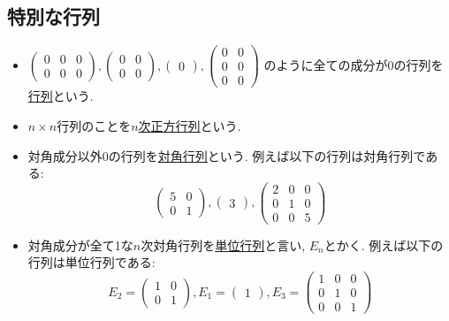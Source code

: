 \documentclass[dvipdfmx,a4paper,11pt]{article}
\theoremstyle{definition}
\begin{document}
\subsection{特別な行列}
\begin{itemize}
\item  $
 \begin{pmatrix}
0 &0&0\\
0 &0&0
 \end{pmatrix}, 
  \begin{pmatrix}
0 &0\\
0 &0
 \end{pmatrix}, 
   \begin{pmatrix}
0 
 \end{pmatrix}, 
   \begin{pmatrix}
0 &0\\
0 &0 \\
0&0
 \end{pmatrix}
 $
 のように全ての成分が0の行列を\underline{行列}という.
 \item $n \times n$行列のことを\underline{$n$次正方行列}という.
 \item 対角成分以外0の行列を\underline{対角行列}という. 例えば以下の行列は対角行列である:
  $$
 \begin{pmatrix}
5&0\\
0 &1
 \end{pmatrix}, 
  \begin{pmatrix}
3
 \end{pmatrix}, 
   \begin{pmatrix}
2&0 &0\\
0 &1 &0\\
0&0&5
 \end{pmatrix}
 $$
 \item 対角成分が全て1な$n$次対角行列を\underline{単位行列}と言い, $E_n$とかく. 例えば以下の行列は単位行列である:
   $$
   E_2 =
 \begin{pmatrix}
1&0\\
0 &1
 \end{pmatrix}, 
 E_1=
  \begin{pmatrix}
1
 \end{pmatrix}, 
 E_3=
   \begin{pmatrix}
1&0 &0\\
0 &1 &0\\
0&0&1
 \end{pmatrix}
 $$
\end{itemize}

\newpage
\end{document}
